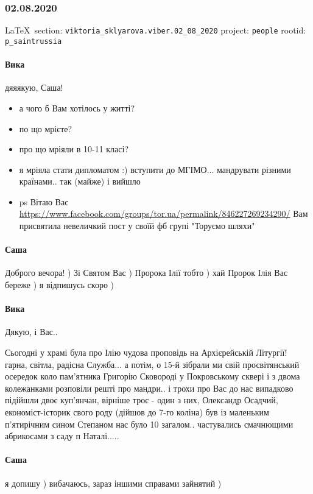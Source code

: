  
 
\subsubsection{02.08.2020}
  
\vspace{0.5cm}
{\small\LaTeX~section: \verb|viktoria_sklyarova.viber.02_08_2020| project: \verb|people| rootid: \verb|p_saintrussia|}
\vspace{0.5cm}

\paragraph{Вика}

дяяякую, Саша!

\begin{itemize}
	\item а чого б Вам хотілось у житті?
	\item по що мрієте?
	\item про що мріяли в 10-11 класі?
	\item я мріяла стати дипломатом :) вступити до МГІМО... мандрувати різними
					країнами..  так (майже) і вийшло

\item ps Вітаю Вас 
\url{https://www.facebook.com/groups/tor.ua/permalink/846227269234290/}
Вам присвятила невеличкий пост у своїй фб групі "Торуємо шляхи"
\end{itemize}

\paragraph{Саша}

Доброго вечора! ) Зі Святом Вас ) Пророка Ілії тобто ) хай Пророк Ілія Вас
береже ) я відпишусь скоро )

\paragraph{Вика}

Дякую, і Вас..

Сьогодні у храмі була про Ілію чудова проповідь на Архієрейській Літургії!
гарна, світла, радісна Служба...  а потім, о 15-й зібрали ми свій
просвітянський осередок коло пам'ятника Григорію Сковороді у Покровському
сквері і з двома колежанками розповіли решті про мандри.. і трохи про Вас до
нас випадково підійшли двоє куп'янчан, вірніше троє - один з них, Олександр
Осадчий, економіст-історик свого роду (дійшов до 7-го коліна) був із маленьким
п'ятирічним сином Степаном нас було 10 загалом.. частувались смачнющими
абрикосами з саду п Наталі.....

\paragraph{Саша}

я допишу ) вибачаюсь, зараз іншими справами зайнятий )
